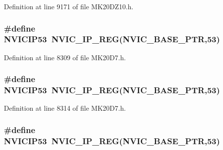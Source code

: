 Definition at line 9171 of file M\+K20\+D\+Z10.\+h.

\subsubsection[{\texorpdfstring{N\+V\+I\+C\+I\+P53}{NVICIP53}}]{\setlength{\rightskip}{0pt plus 5cm}\#define N\+V\+I\+C\+I\+P53~{\bf N\+V\+I\+C\+\_\+\+I\+P\+\_\+\+R\+EG}({\bf N\+V\+I\+C\+\_\+\+B\+A\+S\+E\+\_\+\+P\+TR},53)}\hypertarget{group___n_v_i_c___register___accessor___macros_gaad1e860a15344b47784f6a3ae5b289a3}{}\label{group___n_v_i_c___register___accessor___macros_gaad1e860a15344b47784f6a3ae5b289a3}


Definition at line 8309 of file M\+K20\+D7.\+h.

\subsubsection[{\texorpdfstring{N\+V\+I\+C\+I\+P53}{NVICIP53}}]{\setlength{\rightskip}{0pt plus 5cm}\#define N\+V\+I\+C\+I\+P53~{\bf N\+V\+I\+C\+\_\+\+I\+P\+\_\+\+R\+EG}({\bf N\+V\+I\+C\+\_\+\+B\+A\+S\+E\+\_\+\+P\+TR},53)}\hypertarget{group___n_v_i_c___register___accessor___macros_gaad1e860a15344b47784f6a3ae5b289a3}{}\label{group___n_v_i_c___register___accessor___macros_gaad1e860a15344b47784f6a3ae5b289a3}


Definition at line 8314 of file M\+K20\+D7.\+h.

\subsubsection[{\texorpdfstring{N\+V\+I\+C\+I\+P53}{NVICIP53}}]{\setlength{\rightskip}{0pt plus 5cm}\#define N\+V\+I\+C\+I\+P53~{\bf N\+V\+I\+C\+\_\+\+I\+P\+\_\+\+R\+EG}({\bf N\+V\+I\+C\+\_\+\+B\+A\+S\+E\+\_\+\+P\+TR},53)}\hypertarget{group___n_v_i_c___register___accessor___macros_gaad1e860a15344b47784f6a3ae5b289a3}{}\label{group___n_v_i_c___register___accessor___macros_gaad1e860a15344b47784f6a3ae5b289a3}


